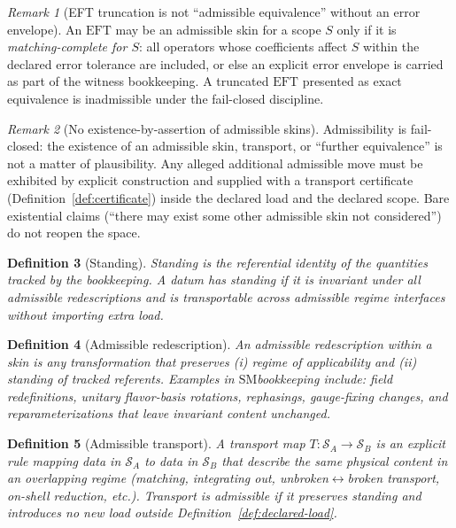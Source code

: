 \documentclass[11pt]{article}
\newtheorem{definition}{Definition}[section]
\theoremstyle{remark}
\newtheorem{remark}[definition]{Remark}
\newcommand{\SM}{\ensuremath{\mathrm{SM}}}
\newcommand{\EFT}{\ensuremath{\mathrm{EFT}}}
\newcommand{\Skin}{\mathcal{S}}
\begin{document}
\begin{remark}[EFT truncation is not ``admissible equivalence'' without an error envelope]\label{rem:eft}
An $\EFT$ may be an admissible skin for a scope $S$ only if it is \emph{matching-complete for $S$}:
all operators whose coefficients affect $S$ within the declared error tolerance are included, or else an
explicit error envelope is carried as part of the witness bookkeeping.
A truncated $\EFT$ presented as exact equivalence is inadmissible under the fail-closed discipline.
\end{remark}

\begin{remark}[No existence-by-assertion of admissible skins]\label{rem:no-existence-by-assertion}
Admissibility is fail-closed: the existence of an admissible skin, transport, or ``further equivalence'' is
not a matter of plausibility. Any alleged additional admissible move must be exhibited by explicit construction
and supplied with a transport certificate (Definition~\ref{def:certificate}) inside the declared load and the
declared scope. Bare existential claims (``there may exist some other admissible skin not considered'') do not
reopen the space.
\end{remark}


\begin{definition}[Standing]\label{def:standing}
\emph{Standing} is the referential identity of the quantities tracked by the bookkeeping.
A datum has standing if it is invariant under all admissible redescriptions \emph{and} is transportable
across admissible regime interfaces without importing extra load.
\end{definition}

\begin{definition}[Admissible redescription]\label{def:redescription}
An \emph{admissible redescription} within a skin is any transformation that preserves (i) regime of
applicability and (ii) standing of tracked referents. Examples in \SM bookkeeping include:
field redefinitions, unitary flavor-basis rotations, rephasings, gauge-fixing changes, and
reparameterizations that leave invariant content unchanged.
\end{definition}

\begin{definition}[Admissible transport]\label{def:transport}
A \emph{transport map} $T:\Skin_A\to\Skin_B$ is an explicit rule mapping data in $\Skin_A$ to data in
$\Skin_B$ that describe the same physical content in an overlapping regime (matching, integrating out,
unbroken$\leftrightarrow$broken transport, on-shell reduction, etc.).
Transport is \emph{admissible} if it preserves standing and introduces no new load outside
Definition~\ref{def:declared-load}.
\end{definition}
\end{document}
